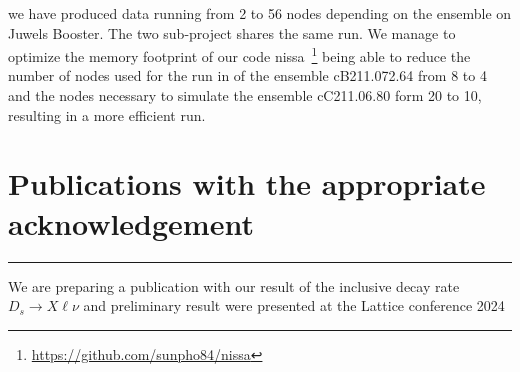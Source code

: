 \documentclass [a4paper, 11pt]{article}
\begin{document}
we have produced data running from 2 to 56 nodes depending on the ensemble
on Juwels Booster. The two sub-project shares the same run. We manage to optimize the
memory footprint of our code nissa~\footnote{\url{https://github.com/sunpho84/nissa}} being 
able to reduce the number of nodes used for the run in of the ensemble cB211.072.64 from 8 to 4 
and the nodes necessary to simulate the ensemble cC211.06.80 form 20 to 10, resulting in a more efficient run.



\section{Publications with the appropriate acknowledgement}
\rule{\textwidth}{0.4pt}

We are preparing a publication with our result of the inclusive decay rate $D_s\to X\ell\nu$ and 
preliminary result were presented at the Lattice conference 2024
\end{document}
